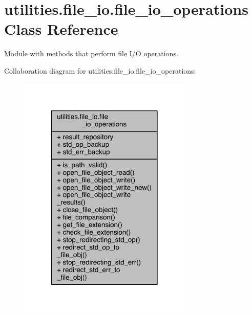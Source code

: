 \hypertarget{classutilities_1_1file__io_1_1file__io__operations}{}\section{utilities.\+file\+\_\+io.\+file\+\_\+io\+\_\+operations Class Reference}
\label{classutilities_1_1file__io_1_1file__io__operations}


Module with methods that perform file I/\+O operations.  




Collaboration diagram for utilities.\+file\+\_\+io.\+file\+\_\+io\+\_\+operations\+:
\nopagebreak
\begin{figure}[H]
\begin{center}
\leavevmode
\includegraphics[width=234pt]{db/d83/classutilities_1_1file__io_1_1file__io__operations__coll__graph}
\end{center}
\end{figure}
